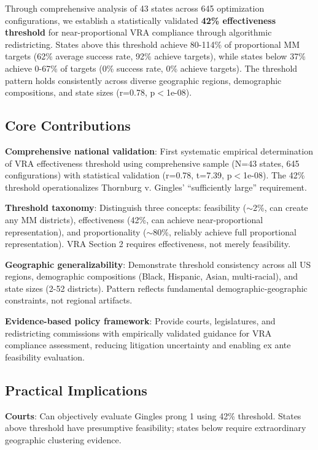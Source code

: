 Through comprehensive analysis of 43 states across 645 optimization configurations, we establish a statistically validated \textbf{42\% effectiveness threshold} for near-proportional VRA compliance through algorithmic redistricting. States above this threshold achieve 80-114\% of proportional MM targets (62\% average success rate, 92\% achieve targets), while states below 37\% achieve 0-67\% of targets (0\% success rate, 0\% achieve targets). The threshold pattern holds consistently across diverse geographic regions, demographic compositions, and state sizes (r=0.78, p$<$1e-08).

\subsection{Core Contributions}

\textbf{Comprehensive national validation}: First systematic empirical determination of VRA effectiveness threshold using comprehensive sample (N=43 states, 645 configurations) with statistical validation (r=0.78, t=7.39, p$<$1e-08). The 42\% threshold operationalizes Thornburg v. Gingles' ``sufficiently large'' requirement.

\textbf{Threshold taxonomy}: Distinguish three concepts: feasibility ($\sim$2\%, can create any MM districts), effectiveness (42\%, can achieve near-proportional representation), and proportionality ($\sim$80\%, reliably achieve full proportional representation). VRA Section 2 requires effectiveness, not merely feasibility.

\textbf{Geographic generalizability}: Demonstrate threshold consistency across all US regions, demographic compositions (Black, Hispanic, Asian, multi-racial), and state sizes (2-52 districts). Pattern reflects fundamental demographic-geographic constraints, not regional artifacts.

\textbf{Evidence-based policy framework}: Provide courts, legislatures, and redistricting commissions with empirically validated guidance for VRA compliance assessment, reducing litigation uncertainty and enabling ex ante feasibility evaluation.

\subsection{Practical Implications}

\textbf{Courts}: Can objectively evaluate Gingles prong 1 using 42\% threshold. States above threshold have presumptive feasibility; states below require extraordinary geographic clustering evidence.

